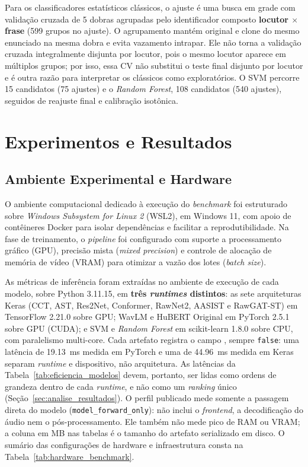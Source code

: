 \documentclass[12pt,a4paper]{article}
\begin{document}
Para os classificadores estatísticos clássicos, o ajuste é uma busca em grade
com validação cruzada de \num{5} dobras agrupadas pelo identificador composto
\textbf{locutor $\times$ frase} (\num{599} grupos no ajuste). O agrupamento
mantém original e clone do mesmo enunciado na mesma dobra e evita vazamento
intrapar. Ele não torna a validação cruzada integralmente disjunta por locutor,
pois o mesmo locutor aparece em múltiplos grupos; por isso, essa CV não substitui
o teste final disjunto por locutor e é outra razão para interpretar os clássicos
como exploratórios. O SVM percorre \num{15} candidatos
(\num{75} ajustes) e o \textit{Random Forest}, \num{108} candidatos
(\num{540} ajustes), seguidos de reajuste final e calibração isotônica.

\section{Experimentos e Resultados}
\label{sec:resultados}

\subsection{Ambiente Experimental e Hardware}
\label{sec:ambiente_experimental}

O ambiente computacional dedicado à execução do \textit{benchmark} foi
estruturado sobre \textit{Windows Subsystem for Linux 2} (WSL2), em Windows 11,
com apoio de contêineres Docker para isolar dependências e facilitar a
reprodutibilidade. Na fase de treinamento, o \textit{pipeline} foi configurado
com suporte a processamento gráfico (GPU), precisão mista (\textit{mixed
	precision}) e controle de alocação de memória de vídeo (VRAM) para otimizar a
vazão dos lotes (\textit{batch size}).

As métricas de inferência foram extraídas no ambiente de execução de cada
modelo, sobre Python 3.11.15, em \textbf{três \textit{runtimes} distintos}:
as sete arquiteturas Keras (CCT, AST, Res2Net, Conformer, RawNet2, AASIST e
RawGAT-ST) em TensorFlow 2.21.0 sobre GPU; WavLM e HuBERT Original em PyTorch
2.5.1 sobre GPU (CUDA); e SVM e \textit{Random Forest} em scikit-learn 1.8.0
sobre CPU, com paralelismo multi-core. Cada artefato registra o campo
, sempre \texttt{false}:
uma latência de \SI{19,13}{\milli\second} medida em PyTorch e uma de
\SI{44,96}{\milli\second} medida em Keras separam \textit{runtime} e
dispositivo, não arquitetura. As latências da
Tabela~\ref{tab:eficiencia_modelos} devem, portanto, ser lidas como ordens de
grandeza dentro de cada \textit{runtime}, e não como um \textit{ranking} único
(Seção~\ref{sec:analise_resultados}). O perfil publicado mede somente a
passagem direta do modelo (\texttt{model\_forward\_only}): não inclui o
\textit{frontend}, a decodificação do áudio nem o pós-processamento. Ele também
não mede pico de RAM ou VRAM; a coluna em MB nas tabelas é o tamanho do
artefato serializado em disco. O sumário das configurações de hardware e
infraestrutura consta na Tabela~\ref{tab:hardware_benchmark}.
\end{document}
